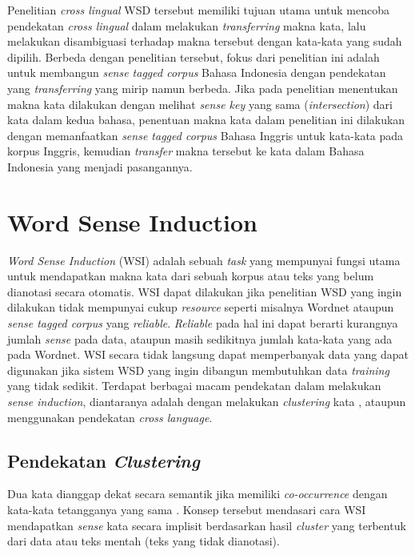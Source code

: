 Penelitian \textit{cross lingual} WSD \citep{septiantri2013wsd} tersebut memiliki tujuan utama untuk mencoba pendekatan \textit{cross lingual} dalam melakukan \textit{transferring} makna kata, lalu melakukan disambiguasi terhadap makna tersebut dengan kata-kata yang sudah dipilih. Berbeda dengan penelitian tersebut, fokus dari penelitian ini adalah untuk membangun \textit{sense tagged corpus} Bahasa Indonesia dengan pendekatan yang \textit{transferring} yang mirip namun berbeda. Jika pada penelitian \citep{septiantri2013wsd} menentukan makna kata dilakukan dengan melihat \textit{sense key} yang sama (\textit{intersection}) dari kata dalam kedua bahasa, penentuan makna kata dalam penelitian ini dilakukan dengan memanfaatkan \textit{sense tagged corpus} Bahasa Inggris untuk kata-kata pada korpus Inggris, kemudian \textit{transfer} makna tersebut ke kata dalam Bahasa Indonesia yang menjadi pasangannya.
\section{Word Sense Induction}
\textit{Word Sense Induction} (WSI) adalah sebuah \textit{task} yang mempunyai fungsi utama untuk mendapatkan makna kata dari sebuah korpus atau teks yang belum dianotasi secara otomatis. WSI dapat dilakukan jika penelitian WSD yang ingin dilakukan tidak mempunyai cukup \textit{resource} seperti misalnya Wordnet ataupun \textit{sense tagged corpus} yang \textit{reliable}. \textit{Reliable} pada hal ini dapat berarti kurangnya jumlah \textit{sense} pada data, ataupun masih sedikitnya jumlah kata-kata yang ada pada Wordnet. WSI secara tidak langsung dapat memperbanyak data yang dapat digunakan jika sistem WSD yang ingin dibangun membutuhkan data \textit{training} yang tidak sedikit. Terdapat berbagai macam pendekatan dalam melakukan \textit{sense induction}, diantaranya adalah dengan melakukan \textit{clustering} kata \citep{denkowski2009survey}, ataupun menggunakan pendekatan \textit{cross language}.
	
	\subsection{Pendekatan \textit{Clustering}}
	Dua kata dianggap dekat secara semantik jika memiliki \textit{co-occurrence} dengan kata-kata tetangganya yang sama \citep{nasiruddin2013state}. Konsep tersebut mendasari cara WSI mendapatkan \textit{sense} kata secara implisit berdasarkan hasil \textit{cluster} yang terbentuk dari data atau teks mentah (teks yang tidak dianotasi).
	
